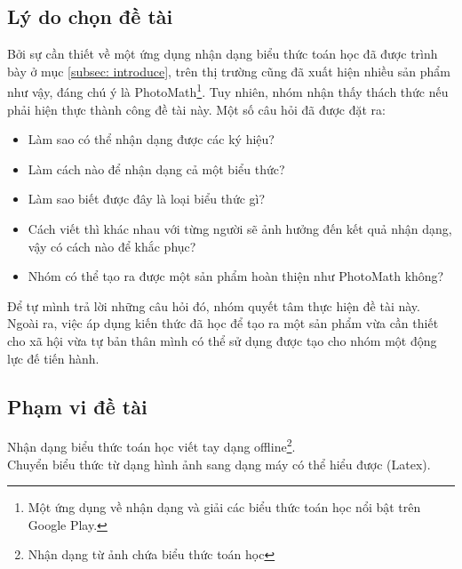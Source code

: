 \documentclass[a4paper,12pt]{article}
\begin{document}
	\subsection{Lý do chọn đề tài}
	Bởi sự cần thiết về một ứng dụng nhận dạng biểu thức toán học đã được trình bày ở mục \ref{subsec: introduce}, trên thị trường cũng đã xuất hiện nhiều sản phẩm như vậy, đáng chú ý là PhotoMath\footnote{Một ứng dụng về nhận dạng và giải các biểu thức toán học nổi bật trên Google Play.}. Tuy nhiên, nhóm nhận thấy thách thức nếu phải hiện thực thành công đề tài này. Một số câu hỏi đã được đặt ra:\\
	\begin{itemize}
		\item Làm sao có thể nhận dạng được các ký hiệu?
		\item Làm cách nào để nhận dạng cả một biểu thức?
		\item Làm sao biết được đây là loại biểu thức gì?
		\item Cách viết thì khác nhau với từng người sẽ ảnh hưởng đến kết quả nhận dạng, vậy có cách nào để khắc phục?
		\item Nhóm có thể tạo ra được một sản phẩm hoàn thiện như PhotoMath không?
		
	\end{itemize}
	Để tự mình trả lời những câu hỏi đó, nhóm quyết tâm thực hiện đề tài này. Ngoài ra, việc áp dụng kiến thức đã học để tạo ra một sản phẩm vừa cần thiết cho xã hội vừa tự bản thân mình có thể sử dụng được tạo cho nhóm một động lực đế tiến hành. 
	
	\subsection{Phạm vi đề tài}
	
	\textendash \hspace{0.3cm}Nhận dạng biểu thức toán học viết tay dạng offline\footnote{Nhận dạng từ ảnh chứa biểu thức toán học}.\\
	\textendash \hspace{0.3cm}Chuyển biểu thức từ dạng hình ảnh sang dạng máy có thể hiểu được (Latex).\\
\end{document}
